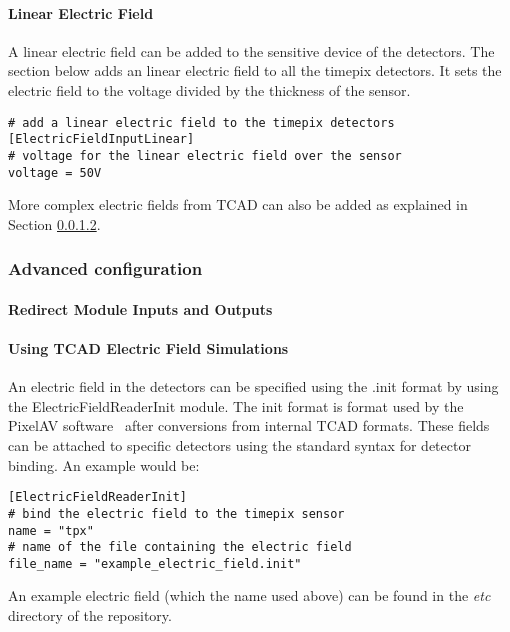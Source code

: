 \paragraph{Linear Electric Field}
\label{sec:module_electric_field}
A linear electric field can be added to the sensitive device of the detectors. The section below adds an linear electric field to all the timepix detectors. It sets the electric field to the voltage divided by the thickness of the sensor.
\begin{verbatim}
# add a linear electric field to the timepix detectors
[ElectricFieldInputLinear]
# voltage for the linear electric field over the sensor
voltage = 50V
\end{verbatim}
More complex electric fields from TCAD can also be added as explained in Section \ref{sec:tcad_electric_field_simulations}.


\subsubsection{Advanced configuration}
\paragraph{Redirect Module Inputs and Outputs}
\label{sec:redirect_module_input_outputs}
\wip

\paragraph{Using TCAD Electric Field Simulations}
\label{sec:tcad_electric_field_simulations}
An electric field in the detectors can be specified using the .init format by using the ElectricFieldReaderInit module. The init format is format used by the PixelAV software~\cite{pixelavgit} after conversions from internal TCAD formats. These fields can be attached to specific detectors using the standard syntax for detector binding. An example would be:
\begin{verbatim}
[ElectricFieldReaderInit]
# bind the electric field to the timepix sensor
name = "tpx"
# name of the file containing the electric field
file_name = "example_electric_field.init"
\end{verbatim}
An example electric field (which the name used above) can be found in the \textit{etc} directory of the \apsq repository.

